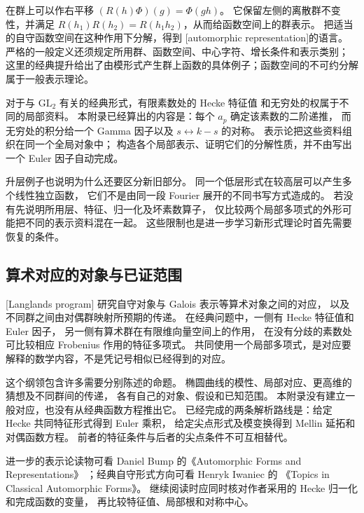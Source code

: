 在群上可以作右平移 \((R(h)\Phi)(g)=\Phi(gh)\)。
它保留左侧的离散群不变性，并满足
\(R(h_1)R(h_2)=R(h_1h_2)\)，从而给函数空间上的群表示。
把适当的自守函数空间在这种作用下分解，得到
[automorphic representation]的语言。
严格的一般定义还须规定所用群、函数空间、中心字符、增长条件和表示类别；
这里的经典提升给出了由模形式产生群上函数的具体例子；函数空间的不可约分解属于一般表示理论。

\ProseParagraphBreak

对于与 \(\mathrm{GL}_2\) 有关的经典形式，有限素数处的 Hecke 特征值
和无穷处的权属于不同的局部资料。
本附录已经算出的内容是：每个 \(a_p\) 确定该素数的二阶递推，
而无穷处的积分给一个 Gamma 因子以及 \(s\leftrightarrow k-s\) 的对称。
表示论把这些资料组织在同一个全局对象中；
构造各个局部表示、证明它们的分解性质，并不由写出一个 Euler 因子自动完成。

\ProseParagraphBreak

升层例子也说明为什么还要区分新旧部分。
同一个低层形式在较高层可以产生多个线性独立函数，
它们不是由同一段 Fourier 展开的不同书写方式造成的。
若没有先说明所用层、特征、归一化及坏素数算子，
仅比较两个局部多项式的外形可能把不同的表示资料混在一起。
这些限制也是进一步学习新形式理论时首先需要恢复的条件。

\subsection{算术对应的对象与已证范围}
\label{b3:subsec:E0503}

[Langlands program]
研究自守对象与 Galois 表示等算术对象之间的对应，
以及不同群之间由对偶群映射所预期的传递。
在经典问题中，一侧有 Hecke 特征值和 Euler 因子，
另一侧有算术群在有限维向量空间上的作用，
在没有分歧的素数处可比较相应 Frobenius 作用的特征多项式。
共同使用一个局部多项式，是对应要解释的数学内容，不是凭记号相似已经得到的对应。

\ProseParagraphBreak

这个纲领包含许多需要分别陈述的命题。
椭圆曲线的模性、局部对应、更高维的猜想及不同群间的传递，
各有自己的对象、假设和已知范围。
本附录没有建立一般对应，也没有从经典函数方程推出它。
已经完成的两条解析路线是：给定 Hecke 共同特征形式得到 Euler 乘积，
给定尖点形式及模变换得到 Mellin 延拓和对偶函数方程。
前者的特征条件与后者的尖点条件不可互相替代。

\ProseParagraphBreak

进一步的表示论读物可看 Daniel Bump 的《Automorphic Forms and Representations》%
\cite{Bump1997Automorphic}；经典自守形式方向可看 Henryk Iwaniec 的
《Topics in Classical Automorphic Forms》\cite{Iwaniec1997Topics}。
继续阅读时应同时核对作者采用的 Hecke 归一化和完成函数的变量，
再比较特征值、局部根和对称中心。

